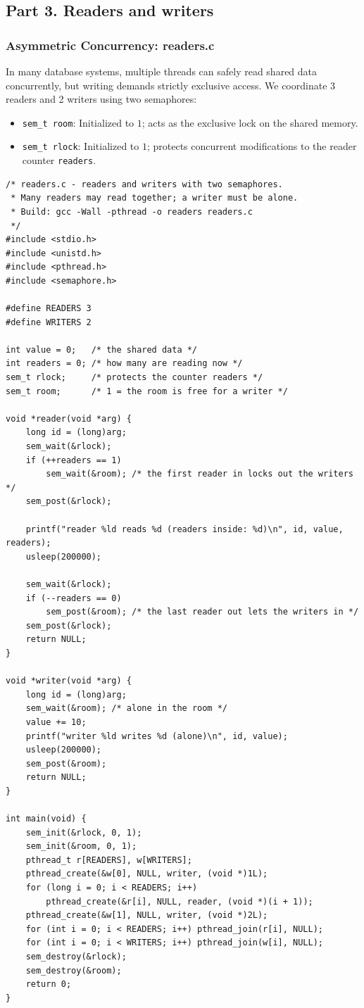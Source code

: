 \documentclass{labreport}
\begin{document}
\subsection{Part 3. Readers and writers}

\subsubsection{Asymmetric Concurrency: readers.c}
In many database systems, multiple threads can safely read shared data concurrently, but writing demands strictly exclusive access. We coordinate 3 readers and 2 writers using two semaphores:
\begin{itemize}[noitemsep]
    \item \texttt{sem\_t room}: Initialized to $1$; acts as the exclusive lock on the shared memory.
    \item \texttt{sem\_t rlock}: Initialized to $1$; protects concurrent modifications to the reader counter \texttt{readers}.
\end{itemize}

\begin{lstlisting}[style=c]
/* readers.c - readers and writers with two semaphores.
 * Many readers may read together; a writer must be alone.
 * Build: gcc -Wall -pthread -o readers readers.c
 */
#include <stdio.h>
#include <unistd.h>
#include <pthread.h>
#include <semaphore.h>

#define READERS 3
#define WRITERS 2

int value = 0;   /* the shared data */
int readers = 0; /* how many are reading now */
sem_t rlock;     /* protects the counter readers */
sem_t room;      /* 1 = the room is free for a writer */

void *reader(void *arg) {
    long id = (long)arg;
    sem_wait(&rlock);
    if (++readers == 1)
        sem_wait(&room); /* the first reader in locks out the writers */
    sem_post(&rlock);

    printf("reader %ld reads %d (readers inside: %d)\n", id, value, readers);
    usleep(200000);

    sem_wait(&rlock);
    if (--readers == 0)
        sem_post(&room); /* the last reader out lets the writers in */
    sem_post(&rlock);
    return NULL;
}

void *writer(void *arg) {
    long id = (long)arg;
    sem_wait(&room); /* alone in the room */
    value += 10;
    printf("writer %ld writes %d (alone)\n", id, value);
    usleep(200000);
    sem_post(&room);
    return NULL;
}

int main(void) {
    sem_init(&rlock, 0, 1);
    sem_init(&room, 0, 1);
    pthread_t r[READERS], w[WRITERS];
    pthread_create(&w[0], NULL, writer, (void *)1L);
    for (long i = 0; i < READERS; i++)
        pthread_create(&r[i], NULL, reader, (void *)(i + 1));
    pthread_create(&w[1], NULL, writer, (void *)2L);
    for (int i = 0; i < READERS; i++) pthread_join(r[i], NULL);
    for (int i = 0; i < WRITERS; i++) pthread_join(w[i], NULL);
    sem_destroy(&rlock);
    sem_destroy(&room);
    return 0;
}
\end{lstlisting}
\end{document}
